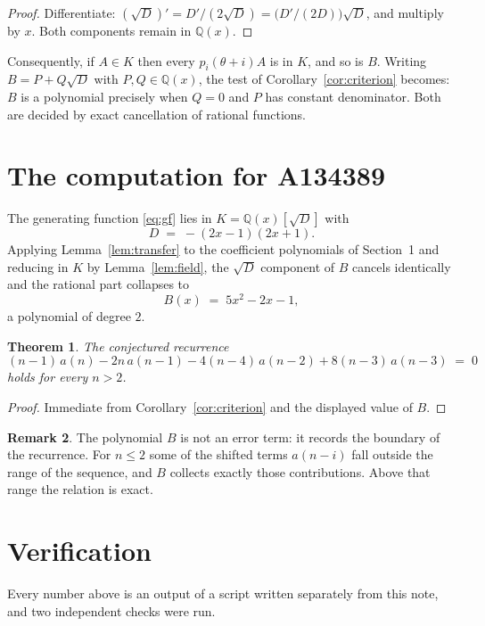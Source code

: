 \documentclass[11pt,a4paper]{article}
\theoremstyle{plain}
\newtheorem{theorem}{Theorem}
\theoremstyle{definition}
\newtheorem{remark}[theorem]{Remark}
\begin{document}
\begin{proof}
Differentiate: $(\sqrt{D})'=D'/(2\sqrt{D})=\bigl(D'/(2D)\bigr)\sqrt{D}$, and multiply by
$x$. Both components remain in $\mathbb{Q}(x)$.
\end{proof}

Consequently, if $A\in K$ then every $p_{i}(\theta+i)A$ is in $K$, and so is $B$. Writing
$B=P+Q\sqrt{D}$ with $P,Q\in\mathbb{Q}(x)$, the test of Corollary~\ref{cor:criterion}
becomes: $B$ is a polynomial precisely when $Q=0$ and $P$ has constant denominator. Both
are decided by exact cancellation of rational functions.

\section{The computation for A134389}

The generating function \eqref{eq:gf} lies in $K=\mathbb{Q}(x)[\sqrt{D}]$ with
\[
D \;=\; - \left(2 x - 1\right) \left(2 x + 1\right) .
\]
Applying Lemma~\ref{lem:transfer} to the coefficient polynomials of Section~1 and reducing
in $K$ by Lemma~\ref{lem:field}, the $\sqrt{D}$ component of $B$ cancels identically and
the rational part collapses to
\[
B(x)\;=\;5 x^{2} - 2 x - 1 ,
\]
a polynomial of degree $2$.

\begin{theorem}
The conjectured recurrence
\[
(n - 1)\,a(n) -  2 n\,a(n-1) -  4 \left(n - 4\right)\,a(n-2) + 8 \left(n - 3\right)\,a(n-3) \;=\;0
\]
holds for every $n>2$.
\end{theorem}

\begin{proof}
Immediate from Corollary~\ref{cor:criterion} and the displayed value of $B$.
\end{proof}

\begin{remark}
The polynomial $B$ is not an error term: it records the boundary of the recurrence. For
$n\le2$ some of the shifted terms $a(n-i)$ fall outside the range of the sequence,
and $B$ collects exactly those contributions. Above that range the relation is exact.
\end{remark}

\section{Verification}

Every number above is an output of a script written separately from this note, and two
independent checks were run.
\end{document}
